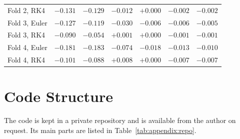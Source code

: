 \begin{table}[!h]
\begin{tabular}{l r r r r r r}
    Fold 2, RK4 & $-0.131$ & $-0.129$ & $-0.012$ & $+0.000$ & $-0.002$ & $-0.002$ \\
    Fold 3, Euler & $-0.127$ & $-0.119$ & $-0.030$ & $-0.006$ & $-0.006$ & $-0.005$ \\
    Fold 3, RK4 & $-0.090$ & $-0.054$ & $+0.001$ & $+0.000$ & $-0.001$ & $-0.001$ \\
    Fold 4, Euler & $-0.181$ & $-0.183$ & $-0.074$ & $-0.018$ & $-0.013$ & $-0.010$ \\
    Fold 4, RK4 & $-0.101$ & $-0.088$ & $+0.008$ & $+0.000$ & $-0.007$ & $-0.007$ \\
    \bottomrule
  \end{tabular}
\end{table}


\cleardoubleoddpage
\chapter{Code Structure}
\label{app:code}

The code is kept in a private repository and is available from the author
on request. Its main parts are listed in
Table~\ref{tab:appendix:repo}.

